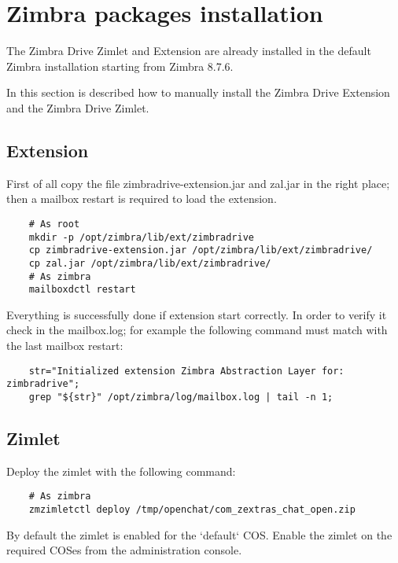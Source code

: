 \section{Zimbra packages installation}

\begin{warning}
    The Zimbra Drive Zimlet and Extension are already installed in the default Zimbra installation
    starting from Zimbra 8.7.6.
\end{warning}
In this section is described how to manually install the Zimbra Drive Extension and the Zimbra Drive Zimlet.
    \subsection{Extension}
    First of all copy the file zimbradrive-extension.jar and zal.jar in the right place;
    then a mailbox restart is required to load the extension.
    \begin{verbatim}
    # As root
    mkdir -p /opt/zimbra/lib/ext/zimbradrive
    cp zimbradrive-extension.jar /opt/zimbra/lib/ext/zimbradrive/
    cp zal.jar /opt/zimbra/lib/ext/zimbradrive/
    # As zimbra
    mailboxdctl restart
    \end{verbatim}
    Everything is successfully done if extension start correctly. In order to verify it check in the mailbox.log;
    for example the following command must match with the last mailbox restart:
    \begin{verbatim}
    str="Initialized extension Zimbra Abstraction Layer for: zimbradrive";
    grep "${str}" /opt/zimbra/log/mailbox.log | tail -n 1;
    \end{verbatim}

    \subsection{Zimlet}
    Deploy the zimlet with the following command:
    \begin{verbatim}
    # As zimbra
    zmzimletctl deploy /tmp/openchat/com_zextras_chat_open.zip
    \end{verbatim}
    By default the zimlet is enabled for the `default` COS.
    Enable the zimlet on the required COSes from the administration console.